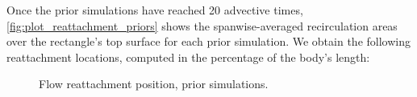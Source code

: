 \documentclass[12pt,twoside]{report}
\begin{document}
%    
%    
%
%
%    
%    
%
%
%    
%    


Once the prior simulations have reached 20 advective times, \autoref{fig:plot_reattachment_priors} shows the spanwise-averaged recirculation areas over the rectangle's top surface for each prior simulation. We obtain the following reattachment locations, computed in the percentage of the body's length:
\begin{figure}[t!]
	\centering
	
	\caption{Flow reattachment position, prior simulations.}
	\label{fig:plot_reattachment_priors}
\end{figure}
\end{document}
